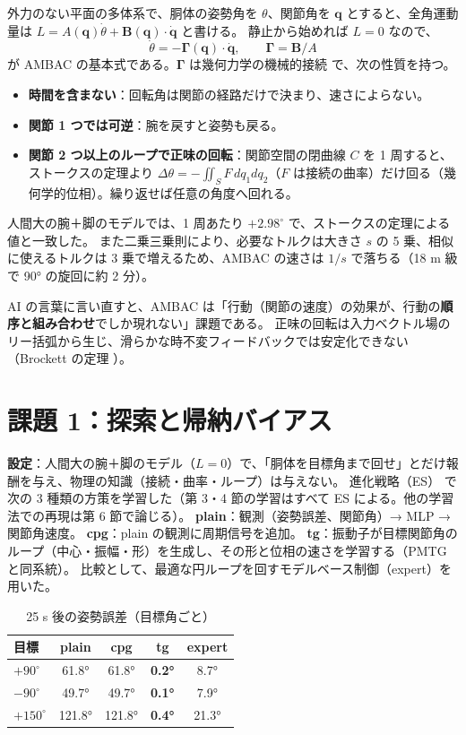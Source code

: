 \documentclass[paper=a4paper,fontsize=10pt,twocolumn,column_gap=2zw,line_length=24zw,number_of_lines=46,head_space=20mm]{jlreq}
\begin{document}
外力のない平面の多体系で、胴体の姿勢角を $\theta$、関節角を $\bm q$ とすると、全角運動量は $L = A(\bm q)\dot\theta + \bm B(\bm q)\cdot\dot{\bm q}$ と書ける。
静止から始めれば $L=0$ なので、
\begin{equation}
\dot\theta = -\bm\Gamma(\bm q)\cdot\dot{\bm q},\qquad \bm\Gamma = \bm B/A
\label{eq:ambac}
\end{equation}
が AMBAC の基本式である。$\bm\Gamma$ は幾何力学の機械的接続 \cite{marsden1992} で、次の性質を持つ。
\begin{itemize}\setlength{\itemsep}{0pt}
\item \textbf{時間を含まない}：回転角は関節の経路だけで決まり、速さによらない。
\item \textbf{関節 1 つでは可逆}：腕を戻すと姿勢も戻る。
\item \textbf{関節 2 つ以上のループで正味の回転}：関節空間の閉曲線 $C$ を 1 周すると、ストークスの定理より
$\Delta\theta = -\iint_S F\,dq_1dq_2$（$F$ は接続の曲率）だけ回る（幾何学的位相）。繰り返せば任意の角度へ回れる。
\end{itemize}
人間大の腕＋脚のモデルでは、1 周あたり $+2.98^\circ$ で、ストークスの定理による値と一致した。
また二乗三乗則により、必要なトルクは大きさ $s$ の 5 乗、相似に使えるトルクは 3 乗で増えるため、AMBAC の速さは $1/s$ で落ちる（18 m 級で 90° の旋回に約 2 分）。

AI の言葉に言い直すと、AMBAC は「行動（関節の速度）の効果が、行動の\textbf{順序と組み合わせ}でしか現れない」課題である。
正味の回転は入力ベクトル場のリー括弧から生じ、滑らかな時不変フィードバックでは安定化できない（Brockett の定理 \cite{brockett1983}）。

\section{課題 1：探索と帰納バイアス}

\textbf{設定}：人間大の腕＋脚のモデル（$L=0$）で、「胴体を目標角まで回せ」とだけ報酬を与え、物理の知識（接続・曲率・ループ）は与えない。
進化戦略（ES）\cite{salimans2017} で次の 3 種類の方策を学習した（第 3・4 節の学習はすべて ES による。他の学習法での再現は第 6 節で論じる）。
\textbf{plain}：観測（姿勢誤差、関節角）→ MLP → 関節角速度。
\textbf{cpg}：plain の観測に周期信号を追加。
\textbf{tg}：振動子が目標関節角のループ（中心・振幅・形）を生成し、その形と位相の速さを学習する（PMTG \cite{iscen2018} と同系統）。
比較として、最適な円ループを回すモデルベース制御（expert）を用いた。

\begin{table}[t]\centering\small
\caption{25 s 後の姿勢誤差（目標角ごと）}\label{tab:learn}
\begin{tabular}{lcccc}\toprule
目標 & plain & cpg & \textbf{tg} & expert \\\midrule
$+90^\circ$ & 61.8° & 61.8° & \textbf{0.2°} & 8.7° \\
$-90^\circ$ & 49.7° & 49.7° & \textbf{0.1°} & 7.9° \\
$+150^\circ$ & 121.8° & 121.8° & \textbf{0.4°} & 21.3° \\\bottomrule
\end{tabular}
\end{table}
\end{document}
